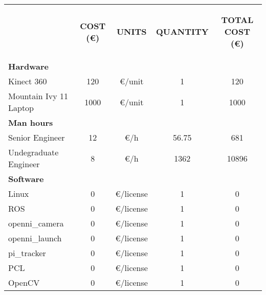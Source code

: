 \begin{appendices}
\begin{table}[H]
\centering
\begin{tabular} {l c c c c}
\toprule
\addlinespace[3mm]
   \multicolumn{1}{c}{\begin{center}\textbf{ITEM}\end{center}} &
   \multicolumn{1}{c}{\begin{center}\textbf{COST (\euro)}\end{center}} &
   \multicolumn{1}{c}{\begin{center}\textbf{UNITS}\end{center}} &
   \multicolumn{1}{c}{\begin{center}\textbf{QUANTITY}\end{center}} &
   \multicolumn{1}{c}{\begin{center}\textbf{TOTAL COST (\euro)}\end{center}} &
\\
\addlinespace[-3mm]
\midrule
\textbf{Hardware}	&&&&		\\					
\hspace*{0.5cm}	Kinect 360	&	120	&	\euro/unit	&	1 	&	120 \\
\hspace*{0.5cm}	Mountain Ivy 11 Laptop	&	1000	&	\euro/unit	&	1	&	1000\\		
\textbf{Man hours}													&&&&		\\		
\hspace*{0.5cm}	Senior Engineer 	&	12	&\euro/h	&	56.75	&	681\\
\hspace*{0.5cm}	Undegraduate Engineer	&	8	&	\euro/h		&	1362	&	10896 \\
						
\textbf{Software}			&&&&		\\						
						
\hspace*{0.5cm}	Linux	&	0 &	\euro/license	&	1	&	0\\
\hspace*{0.5cm}	ROS	&	0	&\euro/license&	1	&0\\
\hspace*{0.8cm}		openni\_camera	&	0	&	\euro/license	&1&		0\\
\hspace*{0.8cm}		openni\_launch	&	0	&	\euro/license	&1&	0\\
\hspace*{0.8cm}		pi\_tracker 		&	0	&	\euro/license	&1&	0\\
\hspace*{0.5cm}	PCL		&	0	&	\euro/license	&	1	&	0\\
\hspace*{0.5cm}	OpenCV	&	0	&	\euro/license	&	1	&	0\\
						

\end{tabular}
\end{table}
\end{appendices}
